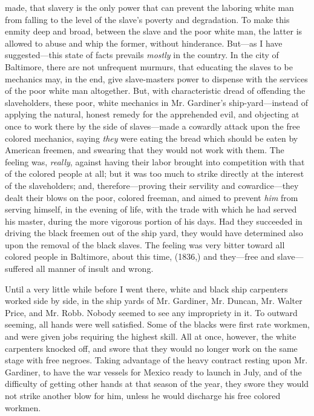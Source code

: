 made, that slavery is the only power that can prevent the laboring white
man from falling to the level of the slave's poverty and {}degradation.
To make this enmity deep and broad, between the slave and the poor white
man, the latter is allowed to abuse and whip the former, without
hinderance. But---as I have suggested---this state of facts prevails
\emph{mostly} in the country. In the city of Baltimore, there are not
unfrequent murmurs, that educating the slaves to be mechanics may, in
the end, give slave-masters power to dispense with the services of the
poor white man altogether. But, with characteristic dread of offending
the slaveholders, these poor, white mechanics in Mr. Gardiner's
ship-yard---instead of applying the natural, honest remedy for the
apprehended evil, and objecting at once to work there by the side of
slaves---made a cowardly attack upon the free colored mechanics, saying
\emph{they} were eating the bread which should be eaten by American
freemen, and swearing that they would not work with them. The feeling
was, \emph{really}, against having their labor brought into competition
with that of the colored people at all; but it was too much to strike
directly at the interest of the slaveholders; and, therefore---proving
their servility and cowardice---they dealt their blows on the poor,
colored freeman, and aimed to prevent \emph{him} from serving himself,
in the evening of life, with the trade with which he had served his
master, during the more vigorous portion of his days. Had they succeeded
in driving the black freemen out of the ship yard, they would have
determined also upon the removal of the black slaves. The feeling was
very bitter toward all colored people in Baltimore, about this time,
(1836,) and they---free and slave---suffered all manner of insult and
wrong.

{}Until a very little while before I went there, white and black ship
carpenters worked side by side, in the ship yards of Mr. Gardiner, Mr.
Duncan, Mr. Walter Price, and Mr. Robb. Nobody seemed to see any
impropriety in it. To outward seeming, all hands were well satisfied.
Some of the blacks were first rate workmen, and were given jobs
requiring the highest skill. All at once, however, the white carpenters
knocked off, and swore that they would no longer work on the same stage
with free negroes. Taking advantage of the heavy contract resting upon
Mr. Gardiner, to have the war vessels for Mexico ready to launch in
July, and of the difficulty of getting other hands at that season of the
year, they swore they would not strike another blow for him, unless he
would discharge his free colored workmen.

